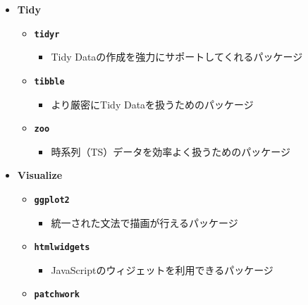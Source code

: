 \documentclass[
  12pt,
]{book}
\providecommand{\tightlist}{%
  \setlength{\itemsep}{0pt}\setlength{\parskip}{0pt}}
\begin{document}
\begin{itemize}
\tightlist
\item
  \textbf{Tidy}

  \begin{itemize}
  \tightlist
  \item
    \textbf{\texttt{tidyr}} \citep{R-tidyr} 

    \begin{itemize}
    \tightlist
    \item
      Tidy Dataの作成を強力にサポートしてくれるパッケージ
    \end{itemize}
  \item
    \textbf{\texttt{tibble}} \citep{R-tibble} 

    \begin{itemize}
    \tightlist
    \item
      より厳密にTidy Dataを扱うためのパッケージ
    \end{itemize}
  \item
    \textbf{\texttt{zoo}} \citep{R-zoo} 

    \begin{itemize}
    \tightlist
    \item
      時系列（TS）データを効率よく扱うためのパッケージ
    \end{itemize}
  \end{itemize}
\item
  \textbf{Visualize}

  \begin{itemize}
  \tightlist
  \item
    \textbf{\texttt{ggplot2}} \citep{R-ggplot2} 

    \begin{itemize}
    \tightlist
    \item
      統一された文法で描画が行えるパッケージ
    \end{itemize}
  \item
    \textbf{\texttt{htmlwidgets}} \citep{R-htmlwidgets} 

    \begin{itemize}
    \tightlist
    \item
      JavaScriptのウィジェットを利用できるパッケージ
    \end{itemize}
  \item
    \textbf{\texttt{patchwork}} \citep{R-patchwork} 


\end{itemize}
\end{itemize}
\end{document}
